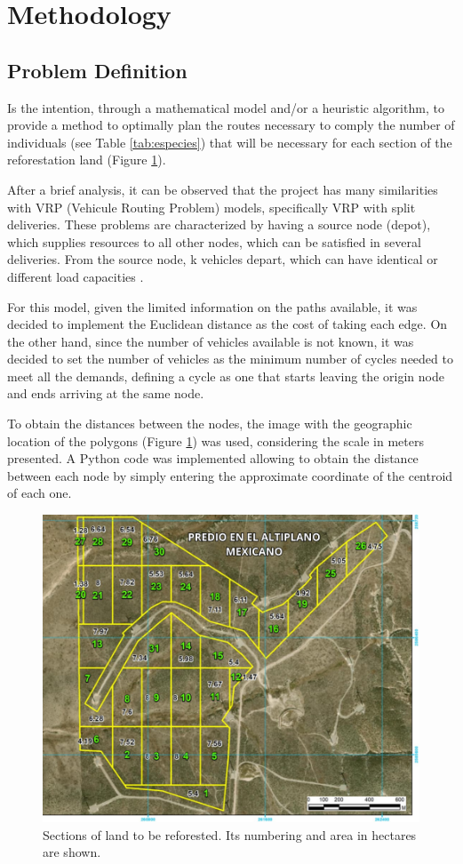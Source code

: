 \documentclass{amsart}
\begin{document}
\section{Methodology}
    \subsection{Problem Definition}
    Is the intention, through a mathematical model and/or a heuristic algorithm, to provide a method to optimally plan the routes necessary to comply the number of individuals (see Table \ref{tab:especies}) that will be necessary for each section of the reforestation land (Figure \ref{fig:tablaDePoligonos}). 

    After a brief analysis, it can be observed that the project has many similarities with VRP (Vehicule Routing Problem) models, specifically VRP with split deliveries. These problems are characterized by having a source node (depot), which supplies resources to all other nodes, which can be satisfied in several deliveries. From the source node, k vehicles depart, which can have identical or different load capacities \parencite{Dror}.
    
    For this model, given the limited information on the paths available, it was decided to implement the Euclidean distance as the cost of taking each edge. On the other hand, since the number of vehicles available is not known, it was decided to set the number of vehicles as the minimum number of cycles needed to meet all the demands, defining a cycle as one that starts leaving the origin node and ends arriving at the same node. 

    To obtain the distances between the nodes, the image with the geographic location of the polygons (Figure \ref{fig:tablaDePoligonos}) was used, considering the scale in meters presented. A Python code was implemented allowing to obtain the distance between each node by simply entering the approximate coordinate of the centroid of each one.
        
        \begin{figure}[ht]
            \centering
            \includegraphics[width=0.5\linewidth]{Sources/Predio.png}
            \caption{Sections of land to be reforested. Its numbering and area in hectares are shown.}
            \label{fig:tablaDePoligonos}
        \end{figure}
    
\end{document}
